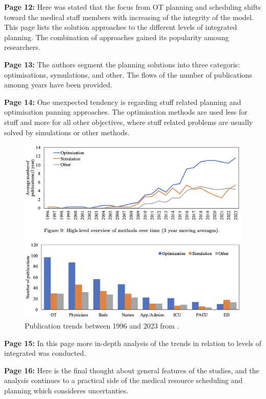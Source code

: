     \textbf{Page 12:}
    Here was stated that the focus from OT planning and scheduling shifts toward the medical staff members with increasing of the integrity of the model. This page lists the solution approaches to the different levels of integrated planning. The combination of approaches gained its popularity amoung researchers.
    
    \textbf{Page 13:}
    The authors segment the planning solutions into three categoris: optimisations, symulations, and other. The flows of the number of publications amonng years have been provided.

    \textbf{Page 14:}
    One unexpected tendency is regarding stuff related planning and optimisation panning approaches. The optimisation methods are used less for stuff and more for all other objectives, where stuff related problems are usually solved by simulations or other methods.
    \begin{figure}[H]
        \centering
        \includegraphics[width=1\textwidth]{figures/0010_SR02NL23/fig6.png}
        \caption{Publication trends between 1996 and 2023 from \cite{x338}.}
        \label{fig6:0010_SR02NL23}
    \end{figure}

    \textbf{Page 15:}
    In this page more in-depth analysis of the trends in relation to levels of integrated was conducted.
    
    \textbf{Page 16:}
    Here is the final thought about general features of the studies, and the analysis continues to a practical side of the medical resource scheduling and planning which consideres uncertanties.
    
